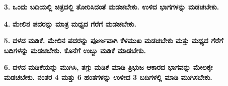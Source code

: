 \begin{enumerate}
\begin{itemize}
\item[{\bf 3.}] \textbf{ಒಂದು ಬದಿಯಲ್ಲಿ ಚಿತ್ರದಲ್ಲಿ ತೋರಿಸಿದಂತೆ ಮಡಚಬೇಕು. ಉಳಿದ ಭಾಗ\-ಗಳನ್ನು ಮಡಚಬೇಕು.}
\begin{figure}[H]
\end{figure}

\item[{\bf 4.}] \textbf{ಮೇಲಿನ ಪದರನ್ನು ಮಾತ್ರ ಮಧ್ಯದ ಗೆರೆಗೆ ಮಡಚಬೇಕು.}

\item[{\bf 5.}] \textbf{ದಳದ ಮಡಿಕೆ. ಮೇಲಿನ ಪದರನ್ನು ಪೂರ್ಣವಾಗಿ ಕೆಳಮುಖ ಮಡಚಬೇಕು ಮತ್ತು ಮಧ್ಯದ ಗೆರೆಗೆ ಬದಿಗಳನ್ನು ಮಡಚಬೇಕು. ಕೊನೆಗೆ ಉಬ್ಬು ಮಡಿಕೆ ಮಾಡಬೇಕು.}
\begin{figure}[H]
\end{figure}

\item[{\bf 6.}] \textbf{ದಳದ ಮಡಿಕೆಯನ್ನು ಮುಗಿಸಿ, ತಗ್ಗು ಮಡಿಕೆ ಮಾಡಿ ತ್ರಿಭುಜ ಆಕಾರದ ಭಾಗವನ್ನು ಮೇಲಕ್ಕೇ ಮಡಚಬೇಕು. ನಂತರ 4 ಮತ್ತು 6 ಹಂತಗಳನ್ನು ಉಳೀದ 3 ಬದಿಗಳಲ್ಲಿ ಮಾಡಿ ಮುಗಿಸಬೇಕು.}

\newpage


\end{itemize}
\end{enumerate}
